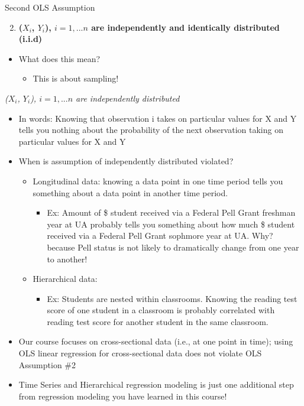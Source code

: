 \documentclass[
  8pt,
  ignorenonframetext,
  dvipsnames]{beamer}
\providecommand{\tightlist}{%
  \setlength{\itemsep}{0pt}\setlength{\parskip}{0pt}}
\renewcommand{\textbf}[1]{{\color{darkgray}\bfseries\fontfamily{Montserrat-TOsF}#1}}
\let\olditem\item
\renewcommand{\item}{%
  \olditem\vspace{4pt}
}
\begin{document}
\begin{frame}{Second OLS Assumption}
\protect\hypertarget{second-ols-assumption}{}

\begin{enumerate}
\setcounter{enumi}{1}
\tightlist
\item
  \textbf{(\(X_i\), \(Y_i\)), \(i=1, ...n\) are independently and
  identically distributed (i.i.d)}
\end{enumerate}

\begin{itemize}
\tightlist
\item
  What does this mean?

  \begin{itemize}
  \tightlist
  \item
    This is about sampling!
  \end{itemize}
\end{itemize}

\medskip

\emph{(\(X_i\), \(Y_i\)), \(i=1, ...n\) are independently distributed}

\begin{itemize}
\tightlist
\item
  In words: Knowing that observation i takes on particular values for X
  and Y tells you nothing about the probability of the next observation
  taking on particular values for X and Y
\item
  When is assumption of independently distributed violated?

  \begin{itemize}
  \tightlist
  \item
    Longitudinal data: knowing a data point in one time period tells you
    something about a data point in another time period.

    \begin{itemize}
    \tightlist
    \item
      Ex: Amount of \$ student received via a Federal Pell Grant
      freshman year at UA probably tells you something about how much \$
      student received via a Federal Pell Grant sophmore year at UA.
      Why? because Pell status is not likely to dramatically change from
      one year to another!
    \end{itemize}
  \item
    Hierarchical data:

    \begin{itemize}
    \tightlist
    \item
      Ex: Students are nested within classrooms. Knowing the reading
      test score of one student in a classroom is probably correlated
      with reading test score for another student in the same classroom.
    \end{itemize}
  \end{itemize}
\item
  Our course focuses on cross-sectional data (i.e., at one point in
  time); using OLS linear regression for cross-sectional data does not
  violate OLS Assumption \#2
\item
  Time Series and Hierarchical regression modeling is just one
  additional step from regression modeling you have learned in this
  course!


\end{itemize}
\end{frame}
\end{document}

